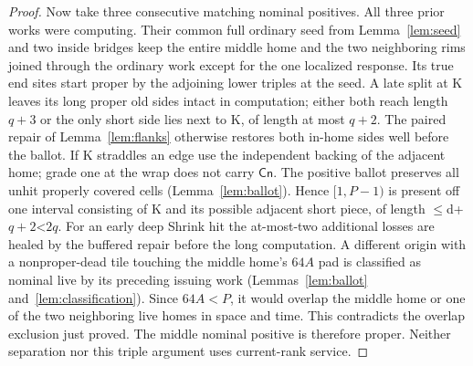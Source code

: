 \begin{proof}
Now take three consecutive matching nominal positives. All three prior works were computing. Their common full ordinary seed from Lemma~\ref{lem:seed} and two inside bridges keep the entire middle home and the two neighboring rims joined through the ordinary work except for the one localized response. Its true end sites start proper by the adjoining lower triples at the seed. A late split at K leaves its long proper old sides intact in computation; either both reach length \(q+3\) or the only short side lies next to K, of length at most \(q+2\). The paired repair of Lemma~\ref{lem:flanks} otherwise restores both in-home sides well before the ballot. If K straddles an edge use the independent backing of the adjacent home; grade one at the wrap does not carry \(\mathsf{Cn}\). The positive ballot preserves all unhit properly covered cells (Lemma~\ref{lem:ballot}). Hence \([1,P- 1)\) is present off one interval consisting of K and its possible adjacent short piece, of length \(\le\)d+\(q+2\)\textless{}\(2q\). For an early deep Shrink hit the at-most-two additional losses are healed by the buffered repair before the long computation. A different origin with a nonproper-dead tile touching the middle home's \(64A\) pad is classified as nominal live by its preceding issuing work (Lemmas~\ref{lem:ballot} and~\ref{lem:classification}). Since \(64A<P\), it would overlap the middle home or one of the two neighboring live homes in space and time. This contradicts the overlap exclusion just proved. The middle nominal positive is therefore proper. Neither separation nor this triple argument uses current-rank service.
\end{proof}

